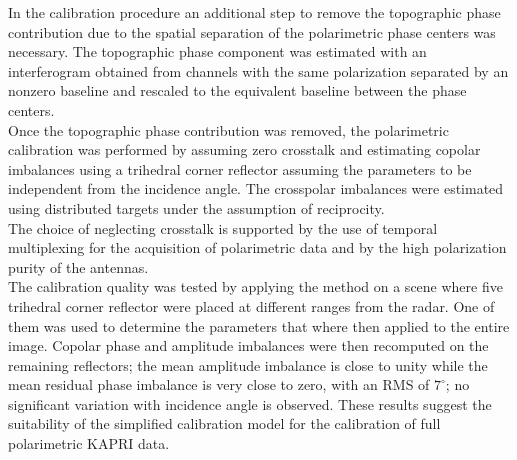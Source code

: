 In the calibration procedure an additional step to remove the topographic phase contribution due to the spatial separation of the polarimetric phase centers was necessary. The topographic phase component was estimated with an interferogram obtained from channels with the same polarization separated by an nonzero baseline and rescaled to the equivalent baseline between the phase centers.\\ Once the topographic phase contribution was removed, the polarimetric calibration was performed by assuming zero crosstalk and estimating copolar imbalances using a trihedral corner reflector assuming the parameters to be independent from the  incidence angle. The crosspolar imbalances were estimated using distributed targets under the assumption of reciprocity.\\ The choice of neglecting crosstalk is supported by the use of temporal multiplexing for the acquisition of polarimetric data and by the high polarization purity of the antennas.\\ The calibration quality was tested by applying the method on a scene where five trihedral corner reflector were placed at different ranges from the radar. One of them was used to determine the parameters that where then applied to the entire image. Copolar phase and amplitude imbalances were then recomputed on the remaining reflectors; the mean amplitude imbalance is close to unity while the mean residual phase imbalance is very close to zero, with an RMS of $7^\circ$; no significant variation with incidence angle is observed. These results suggest the suitability of the simplified calibration model for the calibration of full polarimetric KAPRI data.